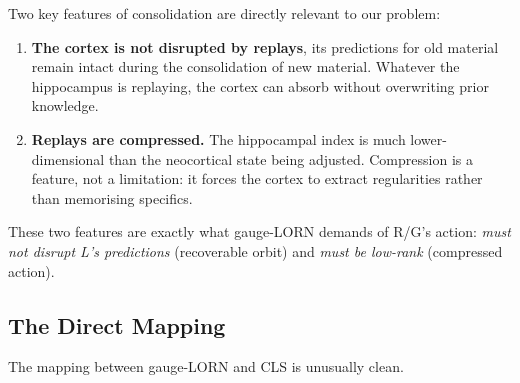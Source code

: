 \documentclass[11pt, a4paper]{article}
\theoremstyle{plain}
\theoremstyle{definition}
\theoremstyle{remark}
\begin{document}
Two key features of consolidation are directly relevant to our problem:

\begin{enumerate}[nosep]
\item \textbf{The cortex is not disrupted by replays}, its predictions for old material remain intact during the consolidation of new material. Whatever the hippocampus is replaying, the cortex can absorb without overwriting prior knowledge.
\item \textbf{Replays are compressed.} The hippocampal index is much lower-dimensional than the neocortical state being adjusted. Compression is a feature, not a limitation: it forces the cortex to extract regularities rather than memorising specifics.
\end{enumerate}

These two features are exactly what gauge-LORN demands of R/G's action: \emph{must not disrupt L's predictions} (recoverable orbit) and \emph{must be low-rank} (compressed action).

\subsection{The Direct Mapping}

The mapping between gauge-LORN and CLS is unusually clean.
\end{document}
